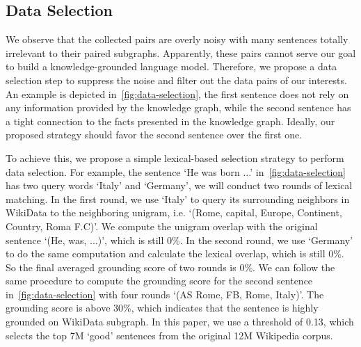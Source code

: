 \documentclass[11pt,a4paper]{article}
\begin{document}
\subsection{Data Selection}
We observe that the collected pairs are overly noisy with many sentences totally irrelevant to their paired subgraphs. Apparently, these pairs cannot serve our goal to build a knowledge-grounded language model. Therefore, we propose a data selection step to suppress the noise and filter out the data pairs of our interests. An example is depicted in~\autoref{fig:data-selection}, the first sentence does not rely on any information provided by the knowledge graph, while the second sentence has a tight connection to the facts presented in the knowledge graph. Ideally, our proposed strategy should favor the second sentence over the first one.

To achieve this, we propose a simple lexical-based selection strategy to perform data selection. For example, the sentence `He was born ...' in~\autoref{fig:data-selection} has two query words `Italy' and `Germany', we will conduct two rounds of lexical matching. In the first round, we use `Italy' to query its surrounding neighbors in WikiData to the neighboring unigram, i.e. `(Rome, capital, Europe, Continent, Country, Roma F.C)'. We compute the unigram overlap with the original sentence `(He, was, ...)', which is still 0\%. In the second round, we use `Germany' to do the same computation and calculate the lexical overlap, which is still 0\%. So the final averaged grounding score of two rounds is 0\%. We can follow the same procedure to compute the grounding score for the second sentence in~\autoref{fig:data-selection} with four rounds `(AS Rome, FB, Rome, Italy)'. The grounding score is above 30\%, which indicates that the sentence is highly grounded on WikiData subgraph. In this paper, we use a threshold of 0.13, which selects the top 7M `good' sentences from the original 12M Wikipedia corpus.
\end{document}
